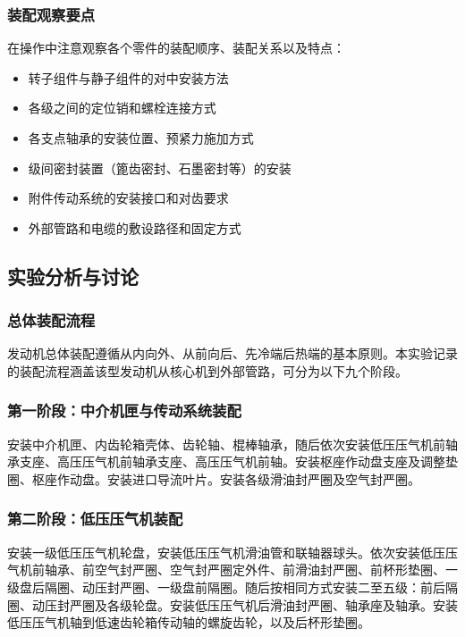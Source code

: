 \subsubsection{装配观察要点}

在操作中注意观察各个零件的装配顺序、装配关系以及特点：
\begin{itemize}
    \item 转子组件与静子组件的对中安装方法
    \item 各级之间的定位销和螺栓连接方式
    \item 各支点轴承的安装位置、预紧力施加方式
    \item 级间密封装置（篦齿密封、石墨密封等）的安装
    \item 附件传动系统的安装接口和对齿要求
    \item 外部管路和电缆的敷设路径和固定方式
\end{itemize}

\subsection{实验分析与讨论}

\subsubsection{总体装配流程}

发动机总体装配遵循从内向外、从前向后、先冷端后热端的基本原则。本实验记录的装配流程涵盖该型发动机从核心机到外部管路，可分为以下九个阶段。

\subsubsection{第一阶段：中介机匣与传动系统装配}

安装中介机匣、内齿轮箱壳体、齿轮轴、棍棒轴承，随后依次安装低压压气机前轴承支座、高压压气机前轴承支座、高压压气机前轴。安装枢座作动盘支座及调整垫圈、枢座作动盘。安装进口导流叶片。安装各级滑油封严圈及空气封严圈。

\subsubsection{第二阶段：低压压气机装配}

安装一级低压压气机轮盘，安装低压压气机滑油管和联轴器球头。依次安装低压压气机前轴承、前空气封严圈、空气封严圈定外件、前滑油封严圈、前杯形垫圈、一级盘后隔圈、动压封严圈、一级盘前隔圈。随后按相同方式安装二至五级：前后隔圈、动压封严圈及各级轮盘。安装低压压气机后滑油封严圈、轴承座及轴承。安装低压压气机轴到低速齿轮箱传动轴的螺旋齿轮，以及后杯形垫圈。

